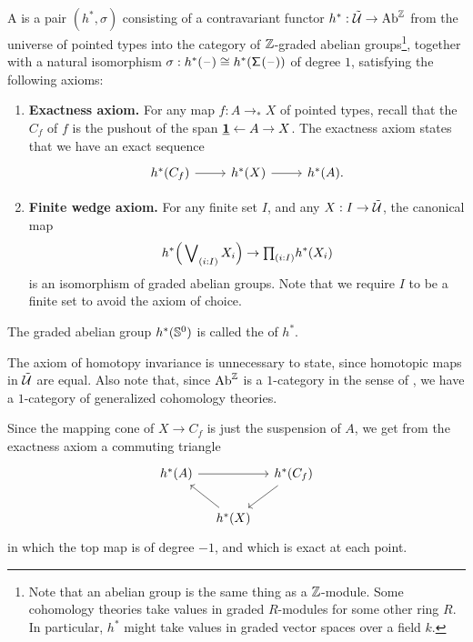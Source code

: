 \documentclass[reqno]{amsart}
\begin{document}
\begin{defn}
A  is a pair $(h^\ast,\sigma)$ consisting of a contravariant functor $h^\ast:\tilde{\mathcal{U}}\to \mathrm{Ab}^\mathbb{Z}$ from the universe of pointed types into the category of $\mathbb{Z}$-graded abelian groups\footnote{Note that an abelian group is the same thing as a $\mathbb{Z}$-module. Some cohomology theories take values in graded $R$-modules for some other ring $R$. In particular, $h^\ast$ might take values in graded vector spaces over a field $k$.}, together with a natural isomorphism $\sigma:h^\ast(\mathord{\hspace{1pt}\text{--}\hspace{1pt}})\cong h^{\ast}(\mathsf{\Sigma}^{}(\mathord{\hspace{1pt}\text{--}\hspace{1pt}}))$ of degree $1$, satisfying the following axioms:
\begin{enumerate}
\item \textbf{Exactness axiom.} For any map $f:A\to_\ast X$ of pointed types, recall that the  $C_f$ of $f$ is the pushout of the span $\underline{\mathbf{1}} \leftarrow A \rightarrow X$. The exactness axiom states that we have an exact sequence
\begin{equation*}
\begin{tikzcd}
h^\ast(C_f) \arrow[r] & h^\ast(X) \arrow[r] & h^\ast(A).
\end{tikzcd}
\end{equation*}
\item \textbf{Finite wedge axiom.} For any finite set $I$, and any $X:I\to\tilde{\mathcal{U}}$, the canonical map
\begin{equation*}
h^\ast\Big(\bigvee\nolimits_{(i:I)} X_i\Big) \to \prd{i:I} h^\ast(X_i)
\end{equation*}
is an isomorphism of graded abelian groups. Note that we require $I$ to be a finite set to avoid the axiom of choice.
\end{enumerate}
The graded abelian group $h^\ast(\mathbb{S}^{0})$ is called the  of $h^\ast$. 
\end{defn}
The axiom of homotopy invariance is unnecessary to state, since homotopic maps in $\tilde{\mathcal{U}}$ are equal. Also note that, since $\mathrm{Ab}^\mathbb{Z}$ is a $1$-category in the sense of \cite{AhrensKapulkinShulman}, we have a $1$-category of generalized cohomology theories.

Since the mapping cone of $X\to C_f$ is just the suspension of $A$, we get from the exactness axiom a commuting triangle
\begin{equation*}
\begin{tikzcd}[column sep=1em]
h^\ast(A) \arrow[rr] & & h^\ast(C_f) \arrow[dl] \\
& h^\ast(X) \arrow[ul]
\end{tikzcd}
\end{equation*}
in which the top map is of degree $-1$, and which is exact at each point.
\end{document}
